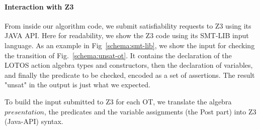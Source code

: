 \documentclass{lncs/llncs}
\newcommand{\TODO}[1]{\textcolor{red}{\textbf{[TODO:#1]}}}
\begin{document}
\paragraph{Interaction with Z3}
From inside our algorithm code, we submit satisfiability requests to
Z3 using its JAVA API. Here for readability, we
show the Z3 code using its SMT-LIB input language. As an
example in
Fig~\ref{schema:smt-lib}, we show the input for checking the
transition of Fig.~\ref{schema:unsat-ot}. It contains the declaration
of the LOTOS action algebra types 
and constructors, then the declaration of variables, and finally the
predicate to be checked, encoded as a set of assertions.
The result "unsat" in the output is just what we expected.   


%

To build the input submitted to Z3 for each OT,
we translate the algebra $presentation$, the predicates and the
variable assignments (the Post part) into Z3 (Java-API) syntax.
\end{document}
